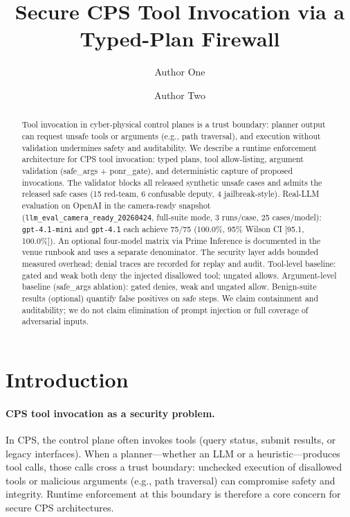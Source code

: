 \documentclass[sigconf]{acmart}
\title{Secure CPS Tool Invocation via a Typed-Plan Firewall}
\author{Author One}
\affiliation{%
  \institution{Institution One}
  \city{City}
  \country{Country}
}
\author{Author Two}
\affiliation{%
  \institution{Institution Two}
  \city{City}
  \country{Country}
}
\begin{document}
\begin{abstract}
Tool invocation in cyber-physical control planes is a trust boundary: planner output can request unsafe tools or arguments (e.g., path traversal), and execution without validation undermines safety and auditability. We describe a runtime enforcement architecture for CPS tool invocation: typed plans, tool allow-listing, argument validation (safe\_args + ponr\_gate), and deterministic capture of proposed invocations. The validator blocks all released synthetic unsafe cases and admits the released safe cases (15 red-team, 6 confusable deputy, 4 jailbreak-style). Real-LLM evaluation on OpenAI in the camera-ready snapshot (\texttt{llm\_eval\_camera\_ready\_20260424}, full-suite mode, 3 runs/case, 25 cases/model): \texttt{gpt-4.1-mini} and \texttt{gpt-4.1} each achieve 75/75 (100.0\%, 95\% Wilson CI [95.1, 100.0\%]). An optional four-model matrix via Prime Inference is documented in the venue runbook and uses a separate denominator. The security layer adds bounded measured overhead; denial traces are recorded for replay and audit. Tool-level baseline: gated and weak both deny the injected disallowed tool; ungated allows. Argument-level baseline (safe\_args ablation): gated denies, weak and ungated allow. Benign-suite results (optional) quantify false positives on safe steps. We claim containment and auditability; we do not claim elimination of prompt injection or full coverage of adversarial inputs.
\end{abstract}

\maketitle

\section{Introduction}

\paragraph{CPS tool invocation as a security problem.}
In CPS, the control plane often invokes tools (query status, submit results, or legacy interfaces). When a planner---whether an LLM or a heuristic---produces tool calls, those calls cross a trust boundary: unchecked execution of disallowed tools or malicious arguments (e.g., path traversal) can compromise safety and integrity. Runtime enforcement at this boundary is therefore a core concern for secure CPS architectures.
\end{document}
